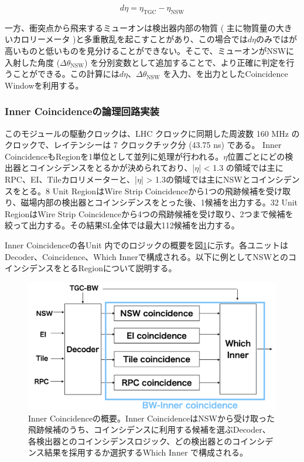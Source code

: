 \begin{equation}
    d\eta = \eta_{\mathrm{TGC}} - \eta_{\mathrm{NSW}}
    \label{eq:deta}
\end{equation}

一方、衝突点から飛来するミューオンは検出器内部の物質 ( 主に物質量の大きいカロリーメータ )と多重散乱を起こすことがあり、この場合では$d\eta$のみでは\pt が高いものと低いものを見分けることができない。そこで、ミューオンがNSWに入射した角度 ($\Delta\theta_{\mathrm{NSW}}$) を分別変数として追加することで、より正確に\pt 判定を行うことができる。この計算には$d\eta$、$\Delta\theta_{\mathrm{NSW}}$ を入力、\pt を出力としたCoincidence Windowを利用する。

\subsubsection*{Inner Coincidenceの論理回路実装}
このモジュールの駆動クロックは、LHC クロックに同期した周波数 160 MHz のクロックで、レイテンシーは 7 クロックチック分 (43.75 ns) である。
Inner CoincidenceもRegionを1単位として並列に処理が行われる。$\eta$位置ごとにどの検出器とコインシデンスをとるかが決められており、|$\eta$| < 1.3 の領域では主にRPC、EI、Tileカロリメーターと、|$\eta$| > 1.3の領域では主にNSWとコインシデンスをとる。8 Unit RegionはWire Strip Coincidenceから1つの飛跡候補を受け取り、磁場内部の検出器とコインシデンスをとった後、1候補を出力する。32 Unit RegionはWire Strip Coincidenceから4つの飛跡候補を受け取り、2つまで候補を絞って出力する。その結果SL全体では最大112候補を出力する。

Inner Coincidenceの各Unit 内でのロジックの概要を図\ref{Inner_logic}に示す。各ユニットはDecoder、Coincidence、Which Innerで構成される。以下に例としてNSWとのコインシデンスをとるRegionについて説明する。

\begin{figure} 
\centering
\includegraphics[width=16cm]{fig/SL/Inner_integrate.png}
\caption[Inner Coincidenceの概要]{Inner Coincidenceの概要\cite{mt_kobayashi}。Inner CoincidenceはNSWから受け取った飛跡候補のうち、コインシデンスに利用する候補を選ぶDecoder、各検出器とのコインシデンスロジック、どの検出器とのコインシデンス結果を採用するか選択するWhich Inner で構成される。}
\label{Inner_logic}
\end{figure}

